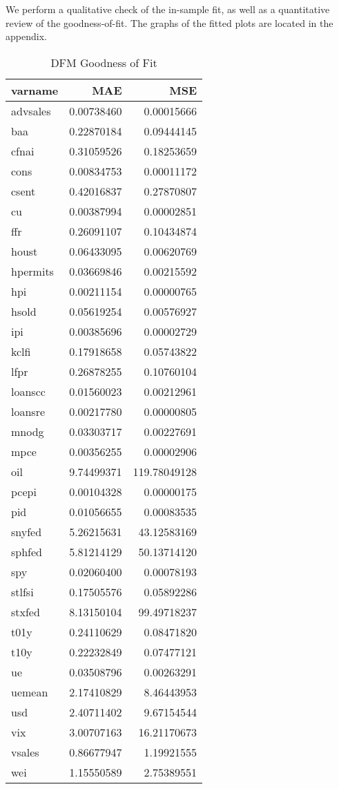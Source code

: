 \documentclass[11pt, letterpaper]{article}\usepackage[]{graphicx}\usepackage[]{color}
\begin{document}
We perform a qualitative check of the in-sample fit, as well as a quantitative review of the goodness-of-fit. The graphs of the fitted plots are located in the appendix.
\begin{table}[H]
\centering
\begingroup\footnotesize
\begin{tabular}{lrr}
  \hline
varname & MAE & MSE \\ 
  \hline
advsales & 0.00738460 & 0.00015666 \\ 
  baa & 0.22870184 & 0.09444145 \\ 
  cfnai & 0.31059526 & 0.18253659 \\ 
  cons & 0.00834753 & 0.00011172 \\ 
  csent & 0.42016837 & 0.27870807 \\ 
  cu & 0.00387994 & 0.00002851 \\ 
  ffr & 0.26091107 & 0.10434874 \\ 
  houst & 0.06433095 & 0.00620769 \\ 
  hpermits & 0.03669846 & 0.00215592 \\ 
  hpi & 0.00211154 & 0.00000765 \\ 
  hsold & 0.05619254 & 0.00576927 \\ 
  ipi & 0.00385696 & 0.00002729 \\ 
  kclfi & 0.17918658 & 0.05743822 \\ 
  lfpr & 0.26878255 & 0.10760104 \\ 
  loanscc & 0.01560023 & 0.00212961 \\ 
  loansre & 0.00217780 & 0.00000805 \\ 
  mnodg & 0.03303717 & 0.00227691 \\ 
  mpce & 0.00356255 & 0.00002906 \\ 
  oil & 9.74499371 & 119.78049128 \\ 
  pcepi & 0.00104328 & 0.00000175 \\ 
  pid & 0.01056655 & 0.00083535 \\ 
  snyfed & 5.26215631 & 43.12583169 \\ 
  sphfed & 5.81214129 & 50.13714120 \\ 
  spy & 0.02060400 & 0.00078193 \\ 
  stlfsi & 0.17505576 & 0.05892286 \\ 
  stxfed & 8.13150104 & 99.49718237 \\ 
  t01y & 0.24110629 & 0.08471820 \\ 
  t10y & 0.22232849 & 0.07477121 \\ 
  ue & 0.03508796 & 0.00263291 \\ 
  uemean & 2.17410829 & 8.46443953 \\ 
  usd & 2.40711402 & 9.67154544 \\ 
  vix & 3.00707163 & 16.21170673 \\ 
  vsales & 0.86677947 & 1.19921555 \\ 
  wei & 1.15550589 & 2.75389551 \\ 
   \hline
\end{tabular}
\endgroup
\caption{DFM Goodness of Fit} 
\end{table}
\end{document}
